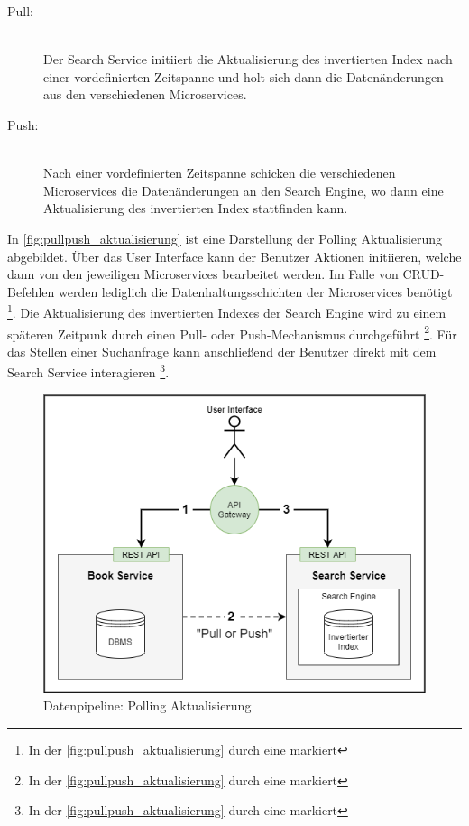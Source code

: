 \begin{description}
    \item[Pull:]\hfill \\
    Der Search Service initiiert die Aktualisierung des invertierten Index nach einer vordefinierten Zeitspanne und holt sich dann die Datenänderungen aus den verschiedenen Microservices.
    
    \item[Push:]\hfill \\
    Nach einer vordefinierten Zeitspanne schicken die verschiedenen Microservices die Datenänderungen an den Search Engine, wo dann eine Aktualisierung des invertierten Index stattfinden kann.

\end{description}

In \autoref{fig:pullpush_aktualisierung} ist eine Darstellung der Polling Aktualisierung abgebildet. Über das User Interface kann der Benutzer Aktionen initiieren, welche dann von den jeweiligen Microservices bearbeitet werden. Im Falle von CRUD-Befehlen werden lediglich die Datenhaltungsschichten der Microservices benötigt \footnote{In der \autoref{fig:pullpush_aktualisierung} durch eine \grqq{} markiert}. Die Aktualisierung des invertierten Indexes der Search Engine wird zu einem späteren Zeitpunk durch einen Pull- oder Push-Mechanismus durchgeführt \footnote{In der \autoref{fig:pullpush_aktualisierung} durch eine \grqq{} markiert}. Für das Stellen einer Suchanfrage kann anschließend der Benutzer direkt mit dem Search Service interagieren \footnote{In der \autoref{fig:pullpush_aktualisierung} durch eine \grqq{} markiert}.

\begin{figure}[H]
    \centering
    \includegraphics[width=0.6\linewidth]{images/pullpush_aktualisierung.png}
    \caption{Datenpipeline: Polling Aktualisierung}
    \label{fig:pullpush_aktualisierung}
\end{figure}

